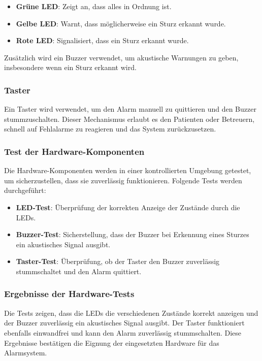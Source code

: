 \begin{itemize}
	\item \textbf{Grüne LED}: Zeigt an, dass alles in Ordnung ist.
	\item \textbf{Gelbe LED}: Warnt, dass möglicherweise ein Sturz erkannt wurde.
	\item \textbf{Rote LED}: Signalisiert, dass ein Sturz erkannt wurde.
\end{itemize}

Zusätzlich wird ein Buzzer verwendet, um akustische Warnungen zu geben, insbesondere wenn ein Sturz erkannt wird. 

\subsubsection{Taster}
Ein Taster wird verwendet, um den Alarm manuell zu quittieren und den Buzzer stummzuschalten. Dieser Mechanismus erlaubt es den Patienten oder Betreuern, schnell auf Fehlalarme zu reagieren und das System zurückzusetzen.

\subsubsection{Test der Hardware-Komponenten}
Die Hardware-Komponenten werden in einer kontrollierten Umgebung getestet, um sicherzustellen, dass sie zuverlässig funktionieren. Folgende Tests werden durchgeführt:

\begin{itemize}
	\item \textbf{LED-Test}: Überprüfung der korrekten Anzeige der Zustände durch die LEDs.
	\item \textbf{Buzzer-Test}: Sicherstellung, dass der Buzzer bei Erkennung eines Sturzes ein akustisches Signal ausgibt.
	\item \textbf{Taster-Test}: Überprüfung, ob der Taster den Buzzer zuverlässig stummschaltet und den Alarm quittiert.
\end{itemize}

\subsubsection{Ergebnisse der Hardware-Tests}
Die Tests zeigen, dass die LEDs die verschiedenen Zustände korrekt anzeigen und der Buzzer zuverlässig ein akustisches Signal ausgibt. Der Taster funktioniert ebenfalls einwandfrei und kann den Alarm zuverlässig stummschalten. Diese Ergebnisse bestätigen die Eignung der eingesetzten Hardware für das Alarmsystem.

